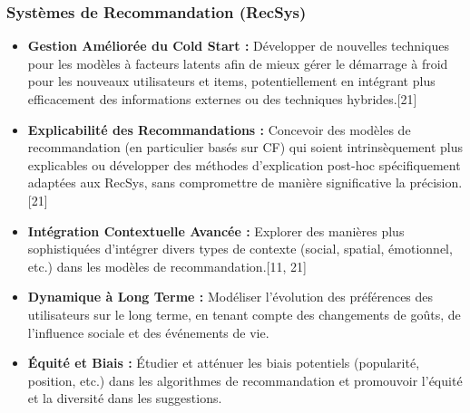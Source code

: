 \documentclass[11pt,a4paper]{article}
\begin{document}
\subsubsection{Systèmes de Recommandation (RecSys)}
\begin{itemize}
    \item \textbf{Gestion Améliorée du Cold Start :} Développer de nouvelles techniques pour les modèles à facteurs latents afin de mieux gérer le démarrage à froid pour les nouveaux utilisateurs et items, potentiellement en intégrant plus efficacement des informations externes ou des techniques hybrides.[21]
    \item \textbf{Explicabilité des Recommandations :} Concevoir des modèles de recommandation (en particulier basés sur CF) qui soient intrinsèquement plus explicables ou développer des méthodes d'explication post-hoc spécifiquement adaptées aux RecSys, sans compromettre de manière significative la précision.[21]
    \item \textbf{Intégration Contextuelle Avancée :} Explorer des manières plus sophistiquées d'intégrer divers types de contexte (social, spatial, émotionnel, etc.) dans les modèles de recommandation.[11, 21]
    \item \textbf{Dynamique à Long Terme :} Modéliser l'évolution des préférences des utilisateurs sur le long terme, en tenant compte des changements de goûts, de l'influence sociale et des événements de vie.
    \item \textbf{Équité et Biais :} Étudier et atténuer les biais potentiels (popularité, position, etc.) dans les algorithmes de recommandation et promouvoir l'équité et la diversité dans les suggestions.
\end{itemize}
\end{document}
